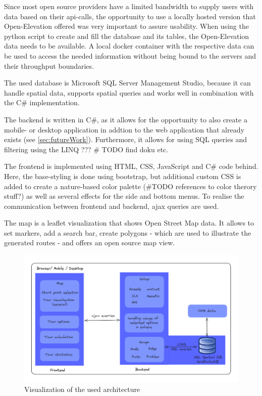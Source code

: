 Since most open source providers have a limited bandwidth to supply users with data based on their api-calls, the opportunity to use a locally hosted version that Open-Elevation offered was very important to assure usability.
When using the python script to create and fill the database and its tables, the Open-Elevation data needs to be available.
A local docker container with the respective data can be used to access the needed information without being bound to the servers and their throughput boundaries.

The used database is Microsoft SQL Server Management Studio, because it can handle spatial data, supports spatial queries and works well in combination with the C\# implementation.

The backend is written in C\#, as it allows for the opportunity to also create a mobile- or desktop application in addtion to the web application that already exists (see \ref{sec:futureWork}).
Furthermore, it allows for using SQL queries and filtering using the LINQ ??? \# TODO find doku etc.

The frontend is implemented using HTML, CSS, JavaScript and C\# code behind. 
Here, the base-styling is done using bootstrap, but additional custom CSS is added to create a nature-based color palette (\#TODO references to color therory stuff?) as well as several effects for the side and bottom menus.
To realise the communication between frontend and backend, ajax queries are used.

The map is a leaflet visualization that shows Open Street Map data.
It allows to set markers, add a search bar, create polygons - which are used to illustrate the generated routes - and offers an open source map view. 




\begin{figure}[H]
	\includegraphics[width=0.9\linewidth]{bilder/Implementation Architecture.png}
	\caption{Visualization of the used architecture}
	\label{fig:architecture}
\end{figure}

